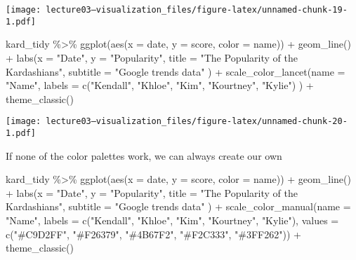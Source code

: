 \documentclass[
]{article}
\newenvironment{Shaded}{\begin{snugshade}}{\end{snugshade}}
\newcommand{\AttributeTok}[1]{\textcolor[rgb]{0.77,0.63,0.00}{#1}}
\newcommand{\FunctionTok}[1]{\textcolor[rgb]{0.00,0.00,0.00}{#1}}
\newcommand{\NormalTok}[1]{#1}
\newcommand{\SpecialCharTok}[1]{\textcolor[rgb]{0.00,0.00,0.00}{#1}}
\newcommand{\StringTok}[1]{\textcolor[rgb]{0.31,0.60,0.02}{#1}}
\begin{document}
\texttt{[image: lecture03---visualization\_files/figure-latex/unnamed-chunk-19-1.pdf]}

\begin{Shaded}
\begin{Highlighting}[]
\NormalTok{kard\_tidy }\SpecialCharTok{\%\textgreater{}\%} 
  \FunctionTok{ggplot}\NormalTok{(}\FunctionTok{aes}\NormalTok{(}\AttributeTok{x =}\NormalTok{ date, }\AttributeTok{y =}\NormalTok{ score, }\AttributeTok{color =}\NormalTok{ name)) }\SpecialCharTok{+}
  \FunctionTok{geom\_line}\NormalTok{() }\SpecialCharTok{+}
  \FunctionTok{labs}\NormalTok{(}\AttributeTok{x =} \StringTok{"Date"}\NormalTok{,}
       \AttributeTok{y =} \StringTok{"Popularity"}\NormalTok{,}
       \AttributeTok{title =} \StringTok{"The Popularity of the Kardashians"}\NormalTok{,}
       \AttributeTok{subtitle =} \StringTok{"Google trends data"}
\NormalTok{       ) }\SpecialCharTok{+}
  \FunctionTok{scale\_color\_lancet}\NormalTok{(}\AttributeTok{name =} \StringTok{"Name"}\NormalTok{,}
                     \AttributeTok{labels =} \FunctionTok{c}\NormalTok{(}\StringTok{"Kendall"}\NormalTok{, }\StringTok{"Khloe"}\NormalTok{, }\StringTok{"Kim"}\NormalTok{, }\StringTok{"Kourtney"}\NormalTok{, }\StringTok{"Kylie"}\NormalTok{)}
\NormalTok{                       ) }\SpecialCharTok{+}
  \FunctionTok{theme\_classic}\NormalTok{()}
\end{Highlighting}
\end{Shaded}

\texttt{[image: lecture03---visualization\_files/figure-latex/unnamed-chunk-20-1.pdf]}

If none of the color palettes work, we can always create our own

\begin{Shaded}
\begin{Highlighting}[]
\NormalTok{kard\_tidy }\SpecialCharTok{\%\textgreater{}\%} 
  \FunctionTok{ggplot}\NormalTok{(}\FunctionTok{aes}\NormalTok{(}\AttributeTok{x =}\NormalTok{ date, }\AttributeTok{y =}\NormalTok{ score, }\AttributeTok{color =}\NormalTok{ name)) }\SpecialCharTok{+}
  \FunctionTok{geom\_line}\NormalTok{() }\SpecialCharTok{+}
  \FunctionTok{labs}\NormalTok{(}\AttributeTok{x =} \StringTok{"Date"}\NormalTok{,}
       \AttributeTok{y =} \StringTok{"Popularity"}\NormalTok{,}
       \AttributeTok{title =} \StringTok{"The Popularity of the Kardashians"}\NormalTok{,}
       \AttributeTok{subtitle =} \StringTok{"Google trends data"}
\NormalTok{       ) }\SpecialCharTok{+}
  \FunctionTok{scale\_color\_manual}\NormalTok{(}\AttributeTok{name =} \StringTok{"Name"}\NormalTok{,}
                     \AttributeTok{labels =} \FunctionTok{c}\NormalTok{(}\StringTok{"Kendall"}\NormalTok{, }\StringTok{"Khloe"}\NormalTok{, }\StringTok{"Kim"}\NormalTok{, }\StringTok{"Kourtney"}\NormalTok{, }\StringTok{"Kylie"}\NormalTok{),}
                     \AttributeTok{values =} \FunctionTok{c}\NormalTok{(}\StringTok{"\#C9D2FF"}\NormalTok{, }\StringTok{"\#F26379"}\NormalTok{, }\StringTok{"\#4B67F2"}\NormalTok{, }\StringTok{"\#F2C333"}\NormalTok{, }\StringTok{"\#3FF262"}\NormalTok{)) }\SpecialCharTok{+}
  \FunctionTok{theme\_classic}\NormalTok{()}
\end{Highlighting}
\end{Shaded}
\end{document}
